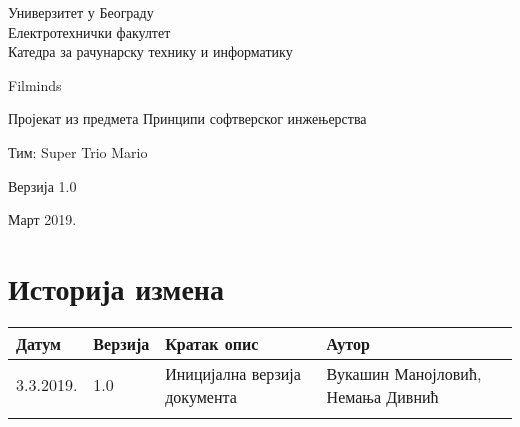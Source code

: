 \documentclass[12pt,a4paper]{article}
\begin{document}
\begin{titlepage}
\begin{center}
    Универзитет у Београду \\
    Електротехнички факултет \\
    Катедра за рачунарску технику и информатику \\
    \vfill

    {\fontsize{50}{60}\selectfont Filminds}
    \vskip 0.6cm

    {\large Пројекат из предмета Принципи софтверског инжењерства }
    \vskip 0.3cm

    {\large Тим: Super Trio Mario}
    \vskip 0.3cm

    {\large Верзија 1.0}

    \vfill
    \vfill

    Март 2019.
    \hfill
\end{center}
\end{titlepage}

\section*{Историја измена}
\noindent
\setcellgapes{4pt}
\makegapedcells
\begin{tabularx}{\linewidth}{|l|l|X|X|}
    \hline
    \textbf{Датум} & \textbf{Верзија} & \textbf{Кратак опис} & \textbf{Аутор} \\
    \hline
    3.3.2019. & 1.0 & Иницијална верзија документа & Вукашин Манојловић, \newline Немања Дивнић \\
    \hline
    & & & \\
    \hline
\end{tabularx}
\newpage

\tableofcontents
\newpage











\end{document}
